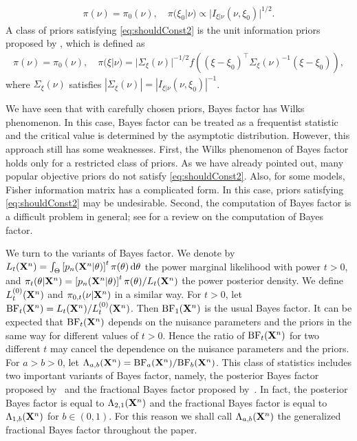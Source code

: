 \documentclass[11pt]{article}
\theoremstyle{plain}
\theoremstyle{definition}
\theoremstyle{remark}
\begin{document}
\begin{align}\label{eq:shouldConst2}
    \pi(\nu) = \pi_0 (\nu), \quad \pi(\xi_0 | \nu) \propto |I_{\xi | \nu} (\nu,\xi_0)|^{1/2}.
\end{align}
A class of priors satisfying \eqref{eq:shouldConst2} is the unit information priors proposed by \cite{Kass1995}, which is defined as
\begin{align*}
    \pi(\nu) = \pi_0 (\nu), \quad \pi(\xi | \nu) = |\Sigma_\xi(\nu)|^{-1/2} f\left((\xi - \xi_0)^\top \Sigma_\xi(\nu)^{-1} ( \xi - \xi_0)\right),
\end{align*}
where $\Sigma_{\xi}(\nu)$ satisfies
$
|\Sigma_{\xi}(\nu)|= |I_{\xi | \nu} (\nu,\xi_0)|^{-1}
$.

We have seen that with carefully chosen priors, Bayes factor has Wilks phenomenon.
In this case, Bayes factor can be treated as a frequentist statistic and the critical value is determined by the asymptotic distribution.
However, this approach still has some weaknesses.
First, the Wilks phenomenon of Bayes factor holds only for a restricted class of priors. %
As we have already pointed out, many popular objective priors do not satisfy \eqref{eq:shouldConst2}.
Also, for some models, Fisher information matrix has a complicated form.
In this case, priors satisfying \eqref{eq:shouldConst2} may be undesirable.
Second, the computation of Bayes factor is a difficult problem in general; see \cite{Friel2012} for a review on the computation of Bayes factor.

We turn to the variants of Bayes factor.
We denote by
$L_t(\mathbf{X}^{n})=\int_{\Theta}\left[p_n(\mathbf{X}^{n}|\theta)\right]^t \pi(\theta)\, \mathrm d\theta$
the power marginal likelihood with power $t>0$,
and $\pi_t (\theta | \mathbf{X}^n) = \left[p_n(\mathbf{X}^{n}|\theta)\right]^t \pi(\theta)/ L_t (\mathbf{X}^n)$ the power  posterior density.
We define $L_t^{(0)}(\mathbf{X}^{n})$ and $\pi_{0, t} (\nu | \mathbf{X}^n)$ in a similar way.
For $t > 0$, let $\text{BF}_t (\mathbf{X}^n) = L_t(\mathbf{X}^n)/ L_t^{(0)} (\mathbf{X}^n)$.
Then $\text{BF}_1(\mathbf{X}^n)$ is the usual Bayes factor.
It can be expected that $\text{BF}_t (\mathbf{X}^n)$ depends on the nuisance parameters and the priors in the same way for different values of $t>0$.
Hence the ratio of $\text{BF}_t (\mathbf{X}^n)$ for two different $t$ may cancel the dependence on the nuisance parameters and the priors.
For $a>b>0$, let
$
\Lambda_{a,b} (\mathbf{X}^n) =
    \text{BF}_a (\mathbf{X}^n)/
    \text{BF}_b (\mathbf{X}^n)
    $.
    This class of statistics includes two important variants of Bayes factor, namely, the posterior Bayes factor proposed by~\cite{Aitkin1991Posterior} and the fractional Bayes factor proposed by~\cite{Fractional1995}.
    In fact, the posterior Bayes factor is equal to $\Lambda_{2,1}(\mathbf{X}^n)$ and the fractional Bayes factor is equal to $\Lambda_{1,b}(\mathbf{X}^n)$ for $b\in (0,1)$.
    For this reason we shall call $\Lambda_{a,b} (\mathbf{X}^n)$ the generalized fractional Bayes factor throughout the paper.
\end{document}
